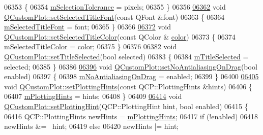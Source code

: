 \begin{DoxyCode}
06353 \{
06354   \hyperlink{a00116_a6694031fcdb13682d098f5d21da86f97}{mSelectionTolerance} = pixels;
06355 \}
06356 
\hypertarget{a00115_source_l06362}{}\hyperlink{a00116_a2face1cc6d467f27aa1a6f3ba5ba112d}{06362} \textcolor{keywordtype}{void} \hyperlink{a00116_a2face1cc6d467f27aa1a6f3ba5ba112d}{QCustomPlot::setSelectedTitleFont}(\textcolor{keyword}{const} QFont &font)
06363 \{
06364   \hyperlink{a00116_a0857efaeb16b387fd17d6423d234cec8}{mSelectedTitleFont} = font;
06365 \}
06366 
\hypertarget{a00115_source_l06372}{}\hyperlink{a00116_ad0897d7ba31a3994d7323f568cdcd2d8}{06372} \textcolor{keywordtype}{void} \hyperlink{a00116_ad0897d7ba31a3994d7323f568cdcd2d8}{QCustomPlot::setSelectedTitleColor}(\textcolor{keyword}{const} QColor &
      \hyperlink{a00116_ae35093fbf4f645dcefd930ca8c68b622}{color})
06373 \{
06374   \hyperlink{a00116_a6b947daad117396a1b6f9d9fe90094d8}{mSelectedTitleColor} = \hyperlink{a00116_ae35093fbf4f645dcefd930ca8c68b622}{color};
06375 \}
06376 
\hypertarget{a00115_source_l06382}{}\hyperlink{a00116_aa89e06c04804ff2a0994ccb1aa80d131}{06382} \textcolor{keywordtype}{void} \hyperlink{a00116_aa89e06c04804ff2a0994ccb1aa80d131}{QCustomPlot::setTitleSelected}(\textcolor{keywordtype}{bool} selected)
06383 \{
06384   \hyperlink{a00116_a36e38c73ea27866ded778ca2a4ce907e}{mTitleSelected} = selected;
06385 \}
06386 
\hypertarget{a00115_source_l06396}{}\hyperlink{a00116_a775bdcb6329d44701aeaa6135b0e5265}{06396} \textcolor{keywordtype}{void} \hyperlink{a00116_a775bdcb6329d44701aeaa6135b0e5265}{QCustomPlot::setNoAntialiasingOnDrag}(\textcolor{keywordtype}{bool} enabled)
06397 \{
06398   \hyperlink{a00116_abfc5e49800e5ca84fa6312b9bb814b3b}{mNoAntialiasingOnDrag} = enabled;
06399 \}
06400 
\hypertarget{a00115_source_l06405}{}\hyperlink{a00116_a94a33cbdadbbac5934843508bcfc210d}{06405} \textcolor{keywordtype}{void} \hyperlink{a00116_a94a33cbdadbbac5934843508bcfc210d}{QCustomPlot::setPlottingHints}(\textcolor{keyword}{const} QCP::PlottingHints &hints)
06406 \{
06407   \hyperlink{a00116_af6de5d56e261af21cf6223179fc58883}{mPlottingHints} = hints;
06408 \}
06409 
\hypertarget{a00115_source_l06414}{}\hyperlink{a00116_a3b7c97bb6c16464e9e15190c07abe9a9}{06414} \textcolor{keywordtype}{void} \hyperlink{a00116_a3b7c97bb6c16464e9e15190c07abe9a9}{QCustomPlot::setPlottingHint}(QCP::PlottingHint hint, \textcolor{keywordtype}{bool} enabled)
06415 \{
06416   QCP::PlottingHints newHints = \hyperlink{a00116_af6de5d56e261af21cf6223179fc58883}{mPlottingHints};
06417   \textcolor{keywordflow}{if} (!enabled)
06418     newHints &= ~hint;
06419   \textcolor{keywordflow}{else}
06420     newHints |= hint;

\end{DoxyCode}
